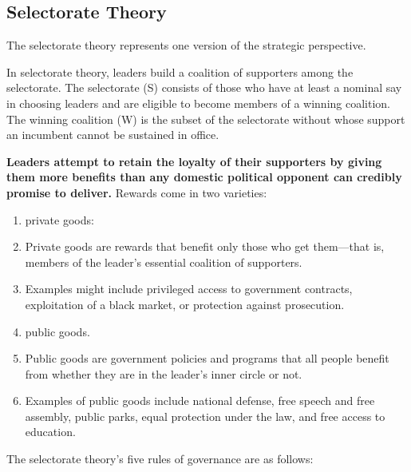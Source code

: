 \subsection{Selectorate Theory}
The selectorate theory represents one version of the strategic perspective.

In selectorate theory, leaders build a coalition of supporters among the selectorate. The selectorate (S) consists of those who have at least a nominal say in choosing leaders and are eligible to become members of a winning coalition. The winning coalition (W) is the subset of the selectorate without whose support an incumbent cannot be sustained in office.

\textbf{Leaders attempt to retain the loyalty of their supporters by giving them more benefits than any domestic political opponent can credibly promise to deliver.}
Rewards come in two varieties:


\begin{enumerate}
    \item [(1)] private goods:
    \item [] Private goods are rewards that benefit only those who get them—that is, members of the leader’s essential coalition of supporters.
    \item [] Examples might include privileged access to government contracts, exploitation of a black market, or protection against prosecution.
    \item [(2)] public goods.
    \item [] Public goods are government policies and programs that all people benefit from whether they are in the leader’s inner circle or not.
    \item [] Examples of public goods include national defense, free speech and free assembly, public parks, equal protection under the law, and free access to education.
\end{enumerate}

The selectorate theory's five rules of governance are as follows:

